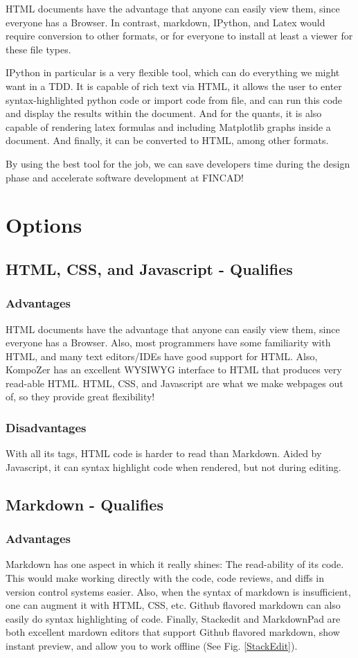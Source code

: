 \documentclass[]{article}
\begin{document}
HTML documents have the advantage that anyone can easily view them, since everyone has a Browser.  In contrast, markdown, IPython, and Latex would require conversion to other formats, or for everyone to install at least a viewer for these file types.

IPython in particular is a very flexible tool, which can do everything we might want in a TDD.  It is capable of rich text via HTML, it allows the user to enter syntax-highlighted python code or import code from file, and can run this code and display the results within the document.  And for the quants, it is also capable of rendering latex formulas and including Matplotlib graphs inside a document.  And finally, it can be converted to HTML, among other formats.

By using the best tool for the job, we can save developers time during the design phase and accelerate software development at FINCAD!

\section{Options}

\subsection{HTML, CSS, and Javascript - Qualifies}
	\subsubsection{Advantages}
		HTML documents have the advantage that anyone can easily view them, since everyone has a Browser.  Also, most programmers have some familiarity with HTML, and many text editors/IDEs have good support for HTML.  Also, KompoZer has an excellent WYSIWYG interface to HTML that produces very read-able HTML.  HTML, CSS, and Javascript are what we make webpages out of, so they provide great flexibility!
	\subsubsection{Disadvantages}
		With all its tags, HTML code is harder to read than Markdown.  Aided by Javascript, it can syntax highlight code when rendered, but not during editing.
	
	
\subsection{Markdown - Qualifies}
	\subsubsection{Advantages}
	Markdown has one aspect in which it really shines: The read-ability of its code.  This would make working directly with the code, code reviews, and diffs in version control systems easier.  Also, when the syntax of markdown is insufficient, one can augment it with HTML, CSS, etc.  Github flavored markdown can also easily do syntax highlighting of code.  Finally, Stackedit and MarkdownPad are both excellent mardown editors that support Github flavored markdown, show instant preview, and allow you to work offline (See Fig. \ref{StackEdit}).
	
\end{document}

